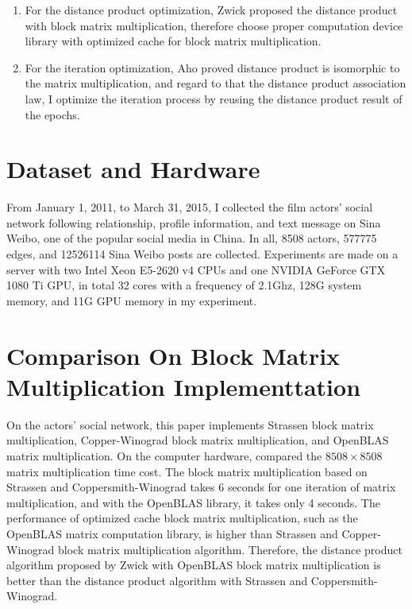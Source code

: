 \documentclass[review]{cvpr}
\begin{document}
\begin{enumerate}
\item For the distance product optimization, Zwick proposed the distance product with block matrix multiplication, therefore choose proper computation device library with optimized cache for block matrix multiplication.
\item For the iteration optimization, Aho proved distance product is isomorphic to the matrix multiplication, and regard to that the distance product association law, I optimize the iteration process by reusing the distance product result of the epochs.
\end{enumerate}


\section{Dataset and Hardware}

From January 1, 2011, to March 31, 2015, I collected the film actors' social network following relationship, profile information, and text message on Sina Weibo, one of the popular social media in China.
In all, 8508 actors, 577775 edges, and 12526114 Sina Weibo posts are collected.
Experiments are made on a server with two Intel Xeon E5-2620 v4 CPUs and one NVIDIA GeForce GTX 1080 Ti GPU, in total 32 cores with a frequency of 2.1Ghz, 128G system memory, and 11G GPU memory in my experiment.



\section{Comparison On Block Matrix Multiplication Implementtation}

On the actors' social network, this paper implements Strassen block matrix multiplication, Copper-Winograd block matrix multiplication, and OpenBLAS matrix multiplication.
On the computer hardware, compared the $8508\times8508$ matrix multiplication time cost.
The block matrix multiplication based on Strassen and Coppersmith-Winograd takes 6 seconds for one iteration of matrix multiplication, and with the OpenBLAS library, it takes only 4 seconds.
The performance of optimized cache block matrix multiplication, such as the OpenBLAS matrix computation library, is higher than Strassen and Copper-Winograd block matrix multiplication algorithm.
Therefore, the distance product algorithm proposed by Zwick with OpenBLAS block matrix multiplication is better than the distance product algorithm with Strassen and Coppersmith-Winograd.
\end{document}
